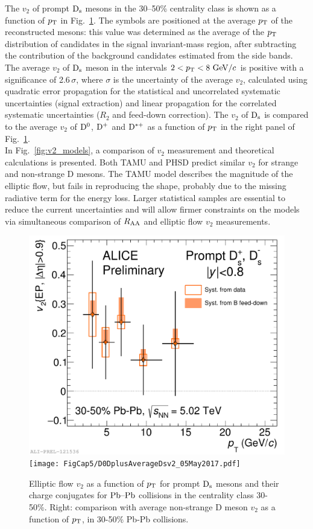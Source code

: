 The $v_2$ of prompt ${\rm D_s}$ mesons in
the 30--50\% centrality class is shown as a function of $p_{\rm T}$ in Fig.~\ref{fig:v2_Ds}.
The symbols are positioned at the average $p_{\rm T}$ of the 
reconstructed mesons: this value was determined as the 
average of the $p_{\rm T}$ distribution of candidates in the signal invariant-mass region, 
after subtracting the contribution of the background 
candidates estimated from the side bands.
The average $v_2$ of ${\rm D_s}$ meson in
 the intervals $2<p_{\rm T}<8~\mathrm{GeV}/c$ is 
 positive with a significance of 2.6\,$\sigma$,
where $\sigma$ is the uncertainty of the average $v_2$, 
calculated using quadratic error propagation for the
 statistical and uncorrelated systematic uncertainties 
(signal extraction) and linear propagation for the correlated 
systematic uncertainties ($R_2$ and feed-down correction).
The $v_2$ of ${\rm D_s}$ is compared to the average $v_2$ of
${\rm D^0}$, ${\rm D^+}$ and ${\rm D^{*+}}$ as a function of $p_{\rm T}$ in the right
panel of Fig.~\ref{fig:v2_Ds}.\\


In Fig.~\ref{fig:v2_models}, a comparison of $v_2$ measurement
and theoretical calculations is presented.
Both TAMU and PHSD predict similar $v_2$ for strange and non-strange
D mesons. The TAMU model describes the magnitude of the elliptic flow, 
but fails in reproducing the shape, probably due to the missing radiative term for the energy loss. 
Larger statistical samples are essential to reduce the current
uncertainties and will allow firmer constraints on the models
via simultaneous comparison of $R_{\rm AA}$ and elliptic flow $v_2$
measurements.

\begin{figure}[!t]
\begin{center}
\includegraphics[width=.49\textwidth]{FigCap5/Dsv2_3050.pdf}
\texttt{[image: FigCap5/D0DplusAverageDsv2\_05May2017.pdf]}
\caption{Elliptic flow $v_2$ as a function of $p_{\rm T}$ for prompt ${\rm D_s}$ mesons 
and their charge conjugates for $\mbox{Pb--Pb}$ collisions in the centrality class 30-50\%.
Right: comparison with average non-strange D meson $v_2$ as a function 
of $p_{\rm T}$, in 30-50\% Pb-Pb collisions. }
\label{fig:v2_Ds} 
\end{center}
\end{figure}

